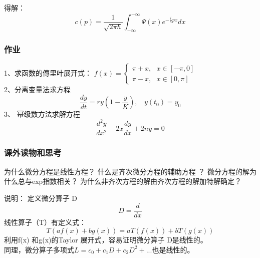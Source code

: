 \begin{frame}
	得解：
	\begin{equation*}
		c(p) = \frac{1}{\sqrt{2\pi \hbar }} \int_{-\infty}^{+\infty} \Psi(x) e^{-\frac{i}{\hbar} px} dx
	\end{equation*}  
\end{frame}


\begin{frame}
\frametitle{作业 }
	1、求函数的傳里叶展开式：
	$\displaystyle f(x)=\begin{cases}
		\pi +x , ~~~ x \in [-\pi, 0] \\
		\pi -x ,~~~ x \in   [0, \pi] 
	\end{cases}$ \\
	2、分离变量法求方程\\
	\begin{equation*}
		\frac{dy}{dt}	=  r y (1-\frac{y}{K}), ~~~~ y(t_0) = y_0
	\end{equation*}
	3、	幂级数方法求解方程\\
	\begin{equation*}
		\frac{d^2 y}{d x^2} -2x \frac{d y}{d x} +2n y =0 
	\end{equation*}     
\end{frame}

\begin{frame}
	\frametitle{课外读物和思考}
	\begin{itemize}
		\IItem 为什么微分方程是线性方程？
		\IItem 什么是齐次微分方程的辅助方程 ？
		\IItem 微分方程的解为什么总与exp指数相关？ 
		\IItem 为什么非齐次方程的解由齐次方程的解加特解确定？
	\end{itemize}	
\end{frame}

\begin{frame}
	\alert{说明：} 	定义微分算子 D
	\begin{equation*}
		D= \dfrac{d}{dx}
	\end{equation*}	
	线性算子（T）有定义式：
	\begin{equation*}
		T(a f(x) +b g(x) )  =a T(f(x)) +b T(g(x)) 
   \end{equation*}	
 	利用f(x) 和g(x)的Taylor 展开式，容易证明微分算子 D是线性的。\\ \vspace{0.3em}
	同理，微分算子多项式$	L= c_0 + c_1D +c_2D^2 +...  $也是线性的。\\
\end{frame}

